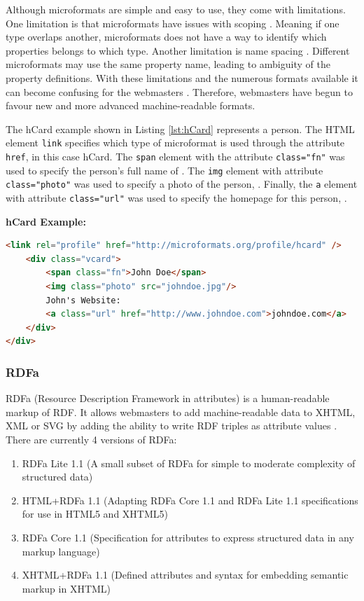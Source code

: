\newpage
Although microformats are simple and easy to use, they come with limitations. One limitation is that microformats have issues with scoping \cite{microformatsIssues}. Meaning if one type overlaps another, microformats does not have a way to identify which properties belongs to which type. Another limitation is name spacing \cite{microformatsIssues}. Different microformats may use the same property name, leading to ambiguity of the property definitions. With these limitations and the numerous formats available it can become confusing for the webmasters \cite{schemaOrg}. Therefore, webmasters have begun to favour new and more advanced machine-readable formats. 

The hCard example shown in Listing \ref{lst:hCard} represents a person. The HTML element \texttt{link} specifies which type of microformat is used through the attribute \texttt{href}, in this case hCard. The \texttt{span} element with the attribute \texttt{class="fn"} was used to specify the person's full name of . The \texttt{img} element with attribute \texttt{class="photo"} was used to specify a photo of the person, . Finally, the \texttt{a} element with attribute \texttt{class="url"} was used to specify the homepage for this person,  \cite{hcardMicroformat}.\newline

\noindent
\textbf{hCard Example:}
{
\begin{lstlisting}[language=HTML,caption={A hCard example},captionpos=b,label={lst:hCard}]
<link rel="profile" href="http://microformats.org/profile/hcard" />
    <div class="vcard">
        <span class="fn">John Doe</span>
        <img class="photo" src="johndoe.jpg"/>
        John's Website: 
        <a class="url" href="http://www.johndoe.com">johndoe.com</a>
    </div>
</div>
\end{lstlisting}
}

\subsubsection{RDFa}
RDFa (Resource Description Framework in attributes) is a human-readable markup of RDF. It allows webmasters to add machine-readable data to XHTML, XML or SVG by adding the ability to write RDF triples as attribute values \cite{sikos2015mastering}. There are currently 4 versions of RDFa: 

{
\begin{enumerate}
    \item RDFa Lite 1.1 (A small subset of RDFa for simple to moderate complexity of structured data) \cite{sporny2015rdfa}
    \item HTML+RDFa 1.1 (Adapting RDFa Core 1.1 and RDFa Lite 1.1 specifications for use in HTML5 and XHTML5) \cite{mccarron2013html+}
    \item RDFa Core 1.1 (Specification for attributes to express structured data in any markup language) \cite{adida2007rdfa}
    \item XHTML+RDFa 1.1  (Defined attributes and syntax for embedding semantic markup in XHTML)
    \cite{adida2008rdfa}
\end{enumerate}
}

